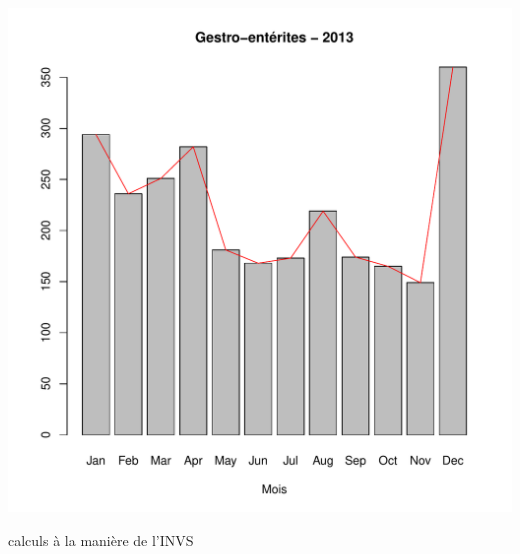 \documentclass[12pt,english,french,twoside]{book}\usepackage[]{graphicx}\usepackage[]{color}
\makeatletter
\def\maxwidth{ %
  \ifdim\Gin@nat@width>\linewidth
    \linewidth
  \else
    \Gin@nat@width
  \fi
}
\newenvironment{knitrout}{}{} %
\makeatother
\begin{document}
\begin{knitrout}
\includegraphics[width=\maxwidth]{figure/ge3} 

\end{knitrout}


calculs à la manière de l'INVS
\end{document}
